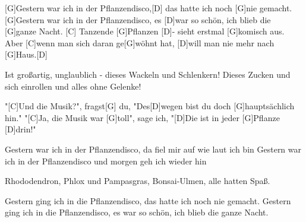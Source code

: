 

\begin{guitar}
	[G]Gestern war ich in der Pflanzendisco,[D] das hatte ich noch [G]nie gemacht.
	[G]Gestern war ich in der Pflanzendisco, es [D]war so schön, ich blieb die [G]ganze Nacht.
	[C] Tanzende [G]Pflanzen [D]- sieht erstmal [G]komisch aus.
	Aber [C]wenn man sich daran ge[G]wöhnt hat, [D]will man nie mehr nach [G]Haus.[D]{}
	
	Ist großartig, unglaublich - dieses Wackeln und Schlenkern!
	Dieses Zucken und sich einrollen und alles ohne Gelenke!
	
	"[C]Und die Musik?", fragst[G] du, "Des[D]wegen bist du doch [G]hauptsächlich hin."
	"[C]Ja, die Musik war [G]toll", sage ich, "[D]Die ist in jeder [G]Pflanze [D]drin!"
	
	 
	
	Gestern war ich in der Pflanzendisco, da fiel mir auf wie laut ich bin
	Gestern war ich in der Pflanzendisco und morgen geh ich wieder hin
	
	Rhododendron, Phlox und Pampasgras,
	Bonsai-Ulmen, alle hatten Spaß.
	
	Gestern ging ich in die Pflanzendisco, das hatte ich noch nie gemacht.
	Gestern ging ich in die Pflanzendisco, es war so schön, ich blieb die ganze Nacht.
	
	 
\end{guitar}